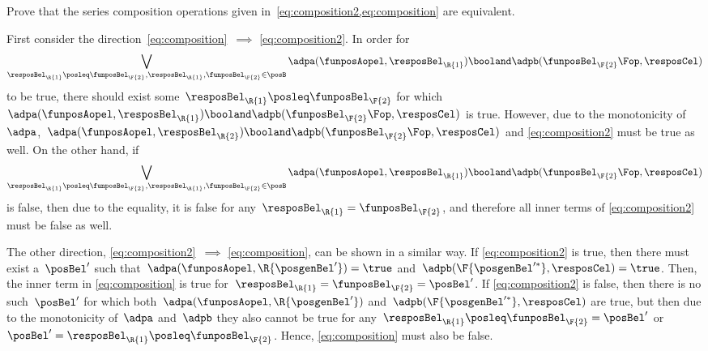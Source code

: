 \begin{exercise}
	\label{ex:composition_equivalency}
	Prove that the series composition operations given in~\cref{eq:composition2,eq:composition} are equivalent.
\end{exercise}
%
\begin{solution}
	First consider the direction~\cref{eq:composition}~$\implies$ \cref{eq:composition2}.
	In order for%
	\begin{equation*}
		\bigvee_{\resposBel_\R{1}\posleq\funposBel_\F{2}, \resposBel_\R{1},\funposBel_\F{2}\in \posB} \adpa(\funposAopel,\resposBel_\R{1}) \booland \adpb(\funposBel_\F{2}\Fop,\resposCel)%
	\end{equation*}
	to be true, there should exist some~$\resposBel_\R{1}\posleq \funposBel_\F{2}$ for which~$\adpa(\funposAopel,\resposBel_\R{1}) \booland\adpb(\funposBel_\F{2}\Fop,\resposCel)$ is true.
	However, due to the monotonicity of~$\adpa$,~$\adpa(\funposAopel,\resposBel_\R{2}) \booland \adpb(\funposBel_\F{2}\Fop,\resposCel)$ and \cref{eq:composition2} must be true as well.
	On the other hand, if%
	\begin{equation*}
		\bigvee_{\resposBel_\R{1}\posleq\funposBel_\F{2}, \resposBel_\R{1},\funposBel_\F{2}\in \posB} \adpa(\funposAopel,\resposBel_\R{1}) \booland \adpb(\funposBel_\F{2}\Fop,\resposCel)%
	\end{equation*}
	is false, then due to the equality, it is false for any~$\resposBel_\R{1}=\funposBel_\F{2}$, and therefore all inner terms of \cref{eq:composition2} must be false as well.

	The other direction, \cref{eq:composition2}~$\implies$ \cref{eq:composition}, can be shown in a similar way.
	If \cref{eq:composition2} is true, then there must exist a~$\posBel'$ such that~$\adpa(\funposAopel, \R{\posgenBel'})=\true$ and~$\adpb(\F{\posgenBel'^*}, \resposCel)=\true$.
	Then, the inner term in \cref{eq:composition} is true for~$\resposBel_\R{1}=\funposBel_\F{2}=\posBel'$.
	If \cref{eq:composition2} is false, then there is no such~$\posBel'$ for which both~$\adpa(\funposAopel, \R{\posgenBel'})$ and~$\adpb(\F{\posgenBel'^*}, \resposCel)$ are true, but then due to the monotonicity of~$\adpa$ and~$\adpb$ they also cannot be true for any~$\resposBel_\R{1} \posleq \funposBel_\F{2} = \posBel'$ or~$\posBel'=\resposBel_\R{1} \posleq \funposBel_\F{2}$.
	Hence, \cref{eq:composition} must also be false.
\end{solution}

